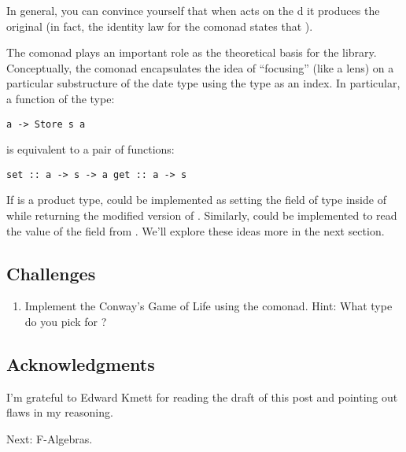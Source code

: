 In general, you can convince yourself that when  acts on
the d  it produces the original
 (in fact, the identity law for the comonad states that
).

The  comonad plays an important role as the theoretical
basis for the  library. Conceptually, the
 comonad encapsulates the idea of ``focusing'' (like
a lens) on a particular substructure of the date type  using
the type  as an index. In particular, a function of the type:

\begin{verbatim}
a -> Store s a
\end{verbatim}

is equivalent to a pair of functions:

\begin{verbatim}
set :: a -> s -> a get :: a -> s
\end{verbatim}

If  is a product type,  could be implemented as
setting the field of type  inside of  while
returning the modified version of . Similarly, 
could be implemented to read the value of the  field from
. We'll explore these ideas more in the next section.

\subsection{Challenges}\label{challenges}

\begin{enumerate}
\tightlist
\item
  Implement the Conway's Game of Life using the  comonad.
  Hint: What type do you pick for ?
\end{enumerate}

\subsection{Acknowledgments}\label{acknowledgments}

I'm grateful to Edward Kmett for reading the draft of this post and
pointing out flaws in my reasoning.

Next: F-Algebras.
